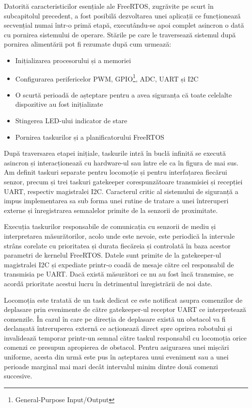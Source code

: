 Datorită caracteristicilor esențiale ale FreeRTOS, zugrăvite pe scurt în subcapitolul precedent, a fost posibilă dezvoltarea unei aplicații ce funcționează secvențial numai într-o primă etapă, executându-se apoi complet asincron o dată cu pornirea sistemului de operare. Stările pe care le traversează sistemul după pornirea alimentării pot fi rezumate după cum urmează:

\begin{itemize}
  \item Inițializarea procesorului și a memoriei
  \item Configurarea perifericelor PWM, GPIO\footnote{General-Purpose Input/Output}, ADC, UART și I2C 
  \item O scurtă perioadă de așteptare pentru a avea siguranța că toate celelalte dispozitive au fost inițializate
  \item Stingerea LED-ului indicator de stare
  \item Pornirea taskurilor și a planificatorului FreeRTOS
\end{itemize}


După traversarea etapei inițiale, taskurile intră în buclă infinită se execută asincron și interacționează cu hardware-ul sau între ele ca în figura de mai sus. Am definit taskuri separate pentru locomoție și pentru interfațarea fiecărui senzor, precum și trei taskuri gatekeeper corespunzătoare transmisiei și recepției UART, respectiv magistralei I2C. Caracterul critic al sistemului de siguranță a impus implementarea sa sub forma unei rutine de tratare a unei întreruperi externe și înregistrarea semnalelor primite de la senzorii de proximitate.

Execuția taskurilor responsabile de comunicația cu senzorii de mediu și interpretarea măsurătorilor, acolo unde este nevoie, este periodică la intervale strâns corelate cu prioritatea și durata fiecăreia și controlată în baza acestor parametri de kernelul FreeRTOS. Datele sunt primite de la gatekeeper-ul magistralei I2C și expediate printr-o coadă de mesaje către cel responsabil de transmisia pe UART. Dacă există măsurători ce nu au fost încă transmise, se acordă prioritate acestui lucru în detrimentul înregistrării de noi date.

Locomoția este tratată de un task dedicat ce este notificat asupra comenzilor de deplasare prin evenimente de către gatekeeper-ul receptor UART ce interpretează comenzile. În cazul în care pe direcția de deplasare există un obstacol va fi declanșată întreruperea externă ce acționează direct spre oprirea robotului și invalidează temporar printr-un semnal către taskul responsabil cu locomoția orice comenzi ce presupun apropierea de obstacol. Pentru asigurarea unei mișcări uniforme, acesta din urmă este pus în așteptarea unui eveniment sau a unei perioade marginal mai mari decât intervalul minim dintre două comenzi succesive.



